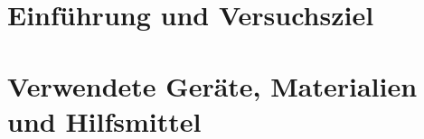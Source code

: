 \documentclass[a4paper,12pt,bibtotocnumbered]{scrartcl}
\numberwithin{equation}{section} %
\begin{document}
\thispagestyle{empty}
\tableofcontents 
\clearpage %


\renewcommand{\thepage}{\arabic{page}}
\setcounter{page}{1}



\listoffigures
{}

\listoftables
{}

\newpage

\section[Einführung]{Einführung und Versuchsziel}



\section[Verwendete Geräte, Materialien und Hilfsmittel]{Verwendete Geräte, Materialien und Hilfsmittel}

\end{document}
